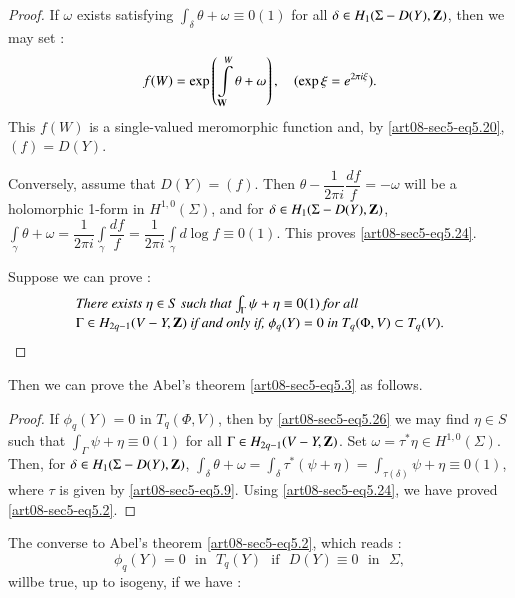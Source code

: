 \begin{proof}
If $\omega$ exists satisfying $\int_{\delta}\theta+\omega\equiv 0(1)$ for all $\delta\in H_{1}(\Sigma-D(Y),\mathbf{Z})$, then we may set :
\begin{equation}
f(W)=\exp \left(\int\limits^{W}_{\mathbf{W}}\theta+\omega\right),\quad (\exp \xi=e^{2\pi i\xi}).\label{art08-sec5-eq5.25}
\end{equation}
This $f(W)$ is a single-valued meromorphic function and, by \eqref{art08-sec5-eq5.20}, $(f)=D(Y)$.

Conversely, assume that $D(Y)=(f)$. Then $\theta-\dfrac{1}{2\pi i}\dfrac{df}{f}=-\omega$ will be a holomorphic 1-form in $H^{1,0}(\Sigma)$, and for $\delta\in H_{1}(\Sigma-D(Y),\mathbf{Z})$, $\int\limits_{\gamma}\theta+\omega=\dfrac{1}{2\pi i}\int\limits_{\gamma}\dfrac{df}{f}=\dfrac{1}{2\pi i}\int\limits_{\gamma}d\log f\equiv 0(1)$. This proves \eqref{art08-sec5-eq5.24}.

Suppose we can prove :
\begin{equation}
\begin{array}{l}
\text{\em There exists $\eta\in S$ such that $\int_{\Gamma}\psi+\eta\equiv 0(1)$ for all}\\[2pt]
\Gamma\in H_{2q-1}(V-Y,\mathbf{Z})\text{~\em if and only if,~}\phi_{q}(Y)=0\text{~\em in~} T_{q}(\Phi,V)\subset T_{q}(V).
\end{array}\label{art08-sec5-eq5.26}
\end{equation}
\end{proof}

Then we can prove the Abel's theorem \eqref{art08-sec5-eq5.3} as follows.

\begin{proof}
If $\phi_{q}(Y)=0$ in $T_{q}(\Phi,V)$, then by \eqref{art08-sec5-eq5.26} we may find $\eta\in S$ such that $\int_{\Gamma}\psi+\eta\equiv 0(1)$ for all $\Gamma\in H_{2q-1}(V-Y,\mathbf{Z})$. Set $\omega=\tau^{*}\eta\in H^{1,0}(\Sigma)$. Then, for $\delta\in H_{1}(\Sigma-D(Y),\mathbf{Z})$, $\int_{\delta}\theta+\omega=\int_{\delta}\tau^{*}(\psi+\eta)=\int_{\tau(\delta)}\psi+\eta\equiv 0(1)$, where $\tau$ is given by \eqref{art08-sec5-eq5.9}. Using \eqref{art08-sec5-eq5.24}, we have proved \eqref{art08-sec5-eq5.2}.
\end{proof}

\setcounter{theorem}{26}
\begin{remark}\label{art08-sec5-rem5.27}
The converse to Abel's theorem \eqref{art08-sec5-eq5.2}, which reads :
\setcounter{equation}{27}
\begin{equation}
\phi_{q}(Y)=0\text{~ in~ } T_{q}(Y)\text{~ if~ } D(Y)\equiv 0\text{~ in~ }\Sigma,\label{art08-sec5-eq5.28}
\end{equation}
will\pageoriginale be true, up to isogeny, if we have :%
\end{remark}
